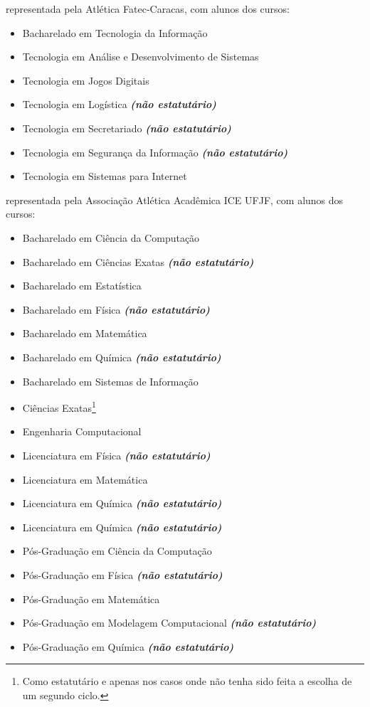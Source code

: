 \begin{article}
\begin{description}[noitemsep]
		\item[Faculdade de Tecnologia - Carapicuíba] representada pela Atlética Fatec-Caracas, com alunos dos cursos:
		\begin{itemize}[noitemsep]
			\item Bacharelado em Tecnologia da Informação
			\item Tecnologia em Análise e Desenvolvimento de Sistemas
			\item Tecnologia em Jogos Digitais
			\item Tecnologia em Logística \textbf{\textit{(não estatutário)}}
			\item Tecnologia em Secretariado \textbf{\textit{(não estatutário)}}
			\item Tecnologia em Segurança da Informação \textbf{\textit{(não estatutário)}}
			\item Tecnologia em Sistemas para Internet
		\end{itemize}

		\item[UFJF] representada pela Associação Atlética Acadêmica ICE UFJF, com alunos dos cursos:
		\begin{itemize}[noitemsep]
			\item Bacharelado em Ciência da Computação
			\item Bacharelado em Ciências Exatas \textbf{\textit{(não estatutário)}}
			\item Bacharelado em Estatística
			\item Bacharelado em Física \textbf{\textit{(não estatutário)}}
			\item Bacharelado em Matemática
			\item Bacharelado em Química \textbf{\textit{(não estatutário)}}
			\item Bacharelado em Sistemas de Informação
			\item Ciências Exatas\footnote{Como estatutário e apenas nos casos onde não tenha sido feita a escolha de um segundo ciclo.}
			\item Engenharia Computacional
			\item Licenciatura em Física \textbf{\textit{(não estatutário)}}
			\item Licenciatura em Matemática
			\item Licenciatura em Química \textbf{\textit{(não estatutário)}}
			\item Licenciatura em Química \textbf{\textit{(não estatutário)}}
			\item Pós-Graduação em Ciência da Computação
			\item Pós-Graduação em Física \textbf{\textit{(não estatutário)}}
			\item Pós-Graduação em Matemática
			\item Pós-Graduação em Modelagem Computacional \textbf{\textit{(não estatutário)}}
			\item Pós-Graduação em Química \textbf{\textit{(não estatutário)}}
		\end{itemize}


\end{description}
\end{article}

